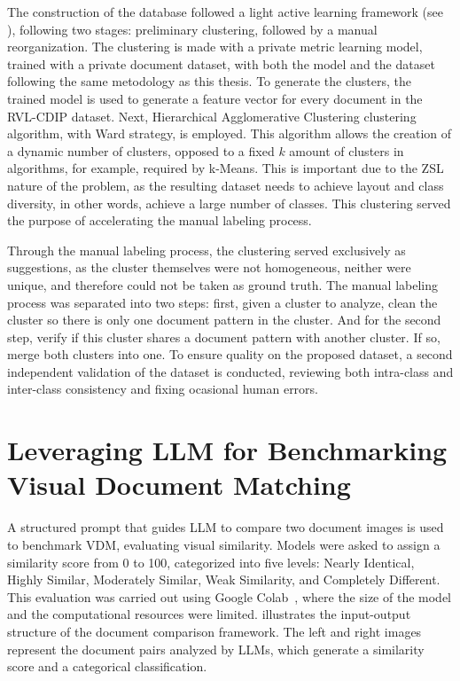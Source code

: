 The construction of the database followed a light active learning framework (see ), following two stages: preliminary clustering, followed by a manual reorganization. The clustering is made with a private metric learning model, trained with a private document dataset, with both the model and the dataset following the same metodology as this thesis. To generate the clusters, the trained model is used to generate a feature vector for every document in the \gls{RVL-CDIP} dataset. Next, Hierarchical Agglomerative Clustering clustering algorithm, with Ward\cite{ward1963} strategy, is employed. This algorithm allows the creation of a dynamic number of clusters, opposed to a fixed $k$ amount of clusters in algorithms, for example, required by k-Means. This is important due to the \gls{ZSL} nature of the problem, as the resulting dataset needs to achieve layout and class diversity, in other words, achieve a large number of classes. This clustering served the purpose of accelerating the manual labeling process.

Through the manual labeling process, the clustering served exclusively as suggestions, as the cluster themselves were not homogeneous, neither were unique, and therefore could not be taken as ground truth. The manual labeling process was separated into two steps: first, given a cluster to analyze, clean the cluster so there is only one document pattern in the cluster. And for the second step, verify if this cluster shares a document pattern with another cluster. If so, merge both clusters into one. To ensure quality on the proposed dataset, a second independent validation of the dataset is conducted, reviewing both intra-class and inter-class consistency and fixing ocasional human errors.

\section{Leveraging LLM for Benchmarking Visual Document Matching}
\label{sec:method_benchmark}

A structured prompt that guides \gls{LLM} to compare two document images is used to benchmark \gls{VDM}, evaluating visual similarity. Models were asked to assign a similarity score from 0 to 100, categorized into five levels: Nearly Identical, Highly Similar, Moderately Similar, Weak Similarity, and Completely Different. This evaluation was carried out using Google Colab~\cite{googlecolab}, where the size of the model and the computational resources were limited.  illustrates the input-output structure of the document comparison framework. The left and right images represent the document pairs analyzed by \glspl{LLM}, which generate a similarity score and a categorical classification.

